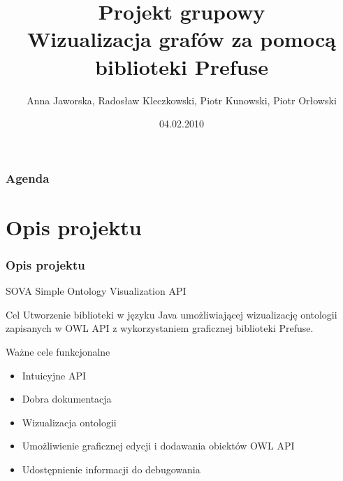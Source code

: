 \documentclass[xcolor=dvipsnames,9pt]{beamer}
\author{Anna Jaworska, Radosław Kleczkowski, Piotr Kunowski, Piotr Orłowski}
\institute[Politechnika Gdańska]{opiekun: mgr inż. Tomasz Maria Boiński}
\title[SOVA]{Projekt grupowy \\ Wizualizacja grafów za pomocą biblioteki Prefuse}
\date{04.02.2010}
\begin{document}
\AtBeginSection[]
{
   \begin{frame}
       \frametitle{}
			\begin{center}
\begin{Huge}
\textcolor{brown}{\textbf{\insertsectionhead}}
\end{Huge}

\end{center}

   \end{frame}
}

\begin{frame}
	\titlepage
\end{frame}

\begin{frame}
	\frametitle{Agenda}
	\tableofcontents
\end{frame}

\section{Opis projektu}

\begin{frame}
	\frametitle{Opis projektu}
	 \begin{block}{SOVA}
		Simple Ontology Visualization API
	\end{block} 

	\begin{block}{Cel}
		Utworzenie biblioteki w języku Java umożliwiającej wizualizację ontologii zapisanych w OWL API z wykorzystaniem graficznej biblioteki Prefuse. 
	\end{block}
	\begin{block}{Ważne cele funkcjonalne}
		\begin{itemize}
			\item	Intuicyjne API
			\item Dobra dokumentacja
			\item Wizualizacja ontologii
			\item Umożliwienie graficznej edycji i dodawania obiektów OWL API
			\item Udostępnienie informacji do debugowania 
	        \end{itemize}
	\end{block}
\end{frame}
\end{document}

